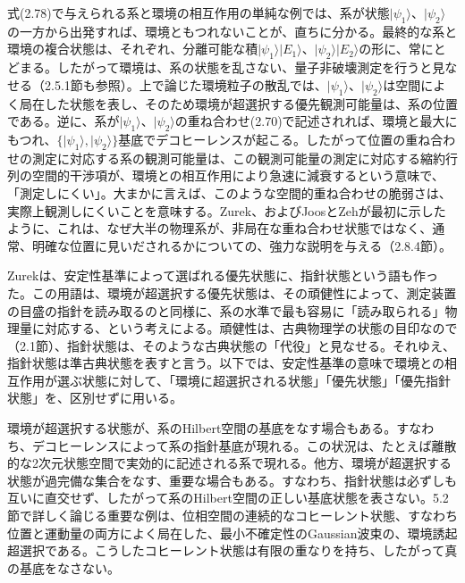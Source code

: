 式(2.78)で与えられる系と環境の相互作用の単純な例では、系が状態$\lvert\psi_1\rangle$、$\lvert\psi_2\rangle$の一方から出発すれば、環境ともつれないことが、直ちに分かる。最終的な系と環境の複合状態は、それぞれ、分離可能な積$\lvert\psi_1\rangle\lvert E_1\rangle$、$\lvert\psi_2\rangle\lvert E_2\rangle$の形に、常にとどまる。したがって環境は、系の状態を乱さない、量子非破壊測定を行うと見なせる（2.5.1節も参照）。上で論じた環境粒子の散乱では、$\lvert\psi_1\rangle$、$\lvert\psi_2\rangle$は空間によく局在した状態を表し、そのため環境が超選択する優先観測可能量は、系の位置である。逆に、系が$\lvert\psi_1\rangle$、$\lvert\psi_2\rangle$の重ね合わせ(2.70)で記述されれば、環境と最大にもつれ、$\{\lvert\psi_1\rangle,\lvert\psi_2\rangle\}$基底でデコヒーレンスが起こる。したがって位置の重ね合わせの測定に対応する系の観測可能量は、この観測可能量の測定に対応する縮約行列の空間的干渉項が、環境との相互作用により急速に減衰するという意味で、「測定しにくい」。大まかに言えば、このような空間的重ね合わせの脆弱さは、実際上観測しにくいことを意味する。Zurek\cite{ref008,ref009,ref012}、およびJoosとZeh\cite{ref007}が最初に示したように、これは、なぜ大半の物理系が、非局在な重ね合わせ状態ではなく、通常、明確な位置に見いだされるかについての、強力な説明を与える（2.8.4節）。

Zurekは、安定性基準によって選ばれる優先状態に、指針状態という語も作った\cite{ref008}。この用語は、環境が超選択する優先状態は、その頑健性によって、測定装置の目盛の指針を読み取るのと同様に、系の水準で最も容易に「読み取られる」物理量に対応する、という考えによる。頑健性は、古典物理学の状態の目印なので（2.1節）、指針状態は、そのような古典状態の「代役」と見なせる。それゆえ、指針状態は準古典状態を表すと言う。以下では、安定性基準の意味で環境との相互作用が選ぶ状態に対して、「環境に超選択される状態」「優先状態」「優先指針状態」を、区別せずに用いる。

\hypertarget{srcpage:75}{}\label{srcpage:75}
環境が超選択する状態が、系のHilbert空間の基底をなす場合もある。すなわち、デコヒーレンスによって系の指針基底が現れる。この状況は、たとえば離散的な2次元状態空間で実効的に記述される系で現れる。他方、環境が超選択する状態が過完備な集合をなす、重要な場合もある。すなわち、指針状態は必ずしも互いに直交せず、したがって系のHilbert空間の正しい基底状態を表さない。5.2節で詳しく論じる重要な例は、位相空間の連続的なコヒーレント状態、すなわち位置と運動量の両方によく局在した、最小不確定性のGaussian波束の、環境誘起超選択である\cite{ref006,ref086}。こうしたコヒーレント状態は有限の重なりを持ち、したがって真の基底をなさない。

